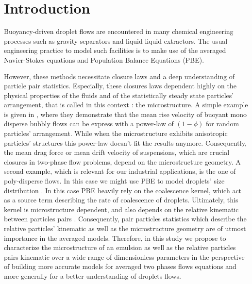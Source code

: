 \section{Introduction}

Buoyancy-driven droplet flows are encountered in many chemical engineering processes such as gravity separators and liquid-liquid extractors. 
The usual engineering practice to model such facilities is to make use of the averaged Navier-Stokes equations and Population Balance Equations (PBE). 

However, these methods necessitate closure laws and a deep understanding of particle pair statistics.
Especially, these closures laws dependent highly on the physical properties of the fluids and of the statistically steady state particles' arrangement, that is called in this context : the microstructure. 
A simple example is given in \citet{yin2008lattice}, where they demonstrate that the mean rise velocity of buoyant mono disperse bubbly flows can be express with a power-law of $(1-\phi)$ for random particles' arrangement.
While when the microstructure exhibits anisotropic particles' structures this power-law doesn't fit the results anymore.
Consequently, the mean drag force or mean drift velocity of suspensions, which are crucial closures in two-phase flow problems, depend on the microstructure geometry.  
A second example, which is relevant for our industrial applications, is the one of poly-disperse flows.
In this case we might use PBE to model droplets' size distribution \citep{randolph2012theory}.
In this case PBE heavily rely on the coalescence kernel, which act as a source term describing the rate of coalescence of droplets.   
Ultimately, this kernel is microstructure dependent, and also depends on the relative kinematic between particles pairs \citep{chesters1991modelling}. 
Consequently, pair particles statistics which describe the relative particles' kinematic as well as the microstructure geometry are of utmost importance in the averaged models. 
Therefore, in this study we propose to characterize the microstructure of an emulsion as well as the relative particles pairs kinematic over a wide range of dimensionless parameters in the perspective of building more accurate models for averaged two phases flows equations and more generally for a better understanding of droplets flows.

